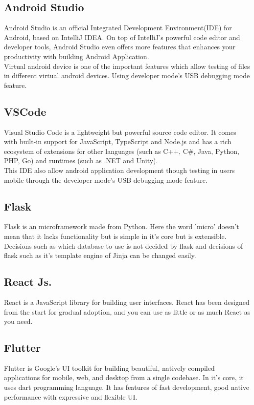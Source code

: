 \subsection{Android Studio}
Android Studio is an official Integrated Development Environment(IDE) for Android, based on IntelliJ IDEA. On top of IntelliJ's powerful code editor and developer tools, Android Studio even offers more features that enhances your productivity with building Android Application.\\
Virtual android device is one of the important features which allow testing of files in different virtual android devices. Using developer mode's USB debugging mode feature.

\subsection{VSCode}
Visual Studio Code is a lightweight but powerful source code editor.  It comes with built-in support for JavaScript, TypeScript and Node.js and has a rich ecosystem of extensions for other languages (such as C++, C\#, Java, Python, PHP, Go) and runtimes (such as .NET and Unity).\\
This IDE also allow android application development though testing in users mobile through the developer mode's USB debugging mode feature.
\subsection{Flask}
Flask is an microframework made from Python. Here the word 'micro' doesn't mean that it lacks functionality but is simple in it's core but is extensible. Decisions such as which database to use is not decided by flask and decisions of flask such as it's template engine of Jinja can be changed easily. 
\subsection{React Js.}
React is a JavaScript library for building user interfaces. React has been designed from the start for gradual adoption, and you can use as little or as much React as you need.
\subsection{Flutter}
Flutter is Google’s UI toolkit for building beautiful, natively compiled applications for mobile, web, and desktop from a single codebase. In it's core, it uses dart programming language. It has features of fast development, good native performance with expressive and flexible UI.
